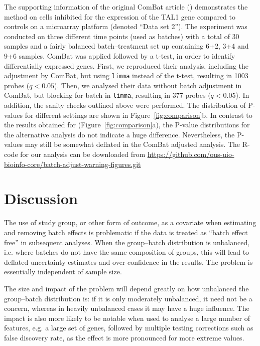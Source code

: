 \documentclass{bio}
\begin{document}
The supporting information of the original ComBat article (\citealp{Johnson2007}) demonstrates the method on cells inhibited for the expression of the TAL1 gene compared to controls on a microarray platform (denoted ``Data set 2''). The experiment was conducted on three different time points (used as batches) with a total of 30 samples and a fairly balanced batch--treatment set up containing 6+2, 3+4 and 9+6 samples. ComBat was applied followed by a t-test, in order to identify differentially expressed genes. First, we reproduced their analysis, including the adjustment by ComBat, but using \texttt{limma} instead of the t-test, resulting in 1003 probes ($q<0.05$).  Then, we analysed their data without batch adjustment in ComBat, but blocking for batch in \texttt{limma}, resulting in 377 probes ($q<0.05$). In addition, the sanity checks outlined above were performed. The distribution of P-values for different settings are shown in Figure~\ref{fig:comparison}b. In contrast to the results obtained for \citet{Towfic2014} (Figure~\ref{fig:comparison}a), the P-value distributions for the alternative analysis do not indicate a huge difference. Nevertheless, the P-values may still be somewhat deflated in the ComBat adjusted analysis. The R-code for our analysis can be downloaded from \href{https://github.com/ous-uio-bioinfo-core/batch-adjust-warning-figures.git}{https://github.com/ous-uio-bioinfo-core/batch-adjust-warning-figures.git}


\section{Discussion}

The use of study group, or other form of outcome, as a covariate when estimating and removing batch effects is problematic if the data is treated as ``batch effect free'' in subsequent analyses. When the group--batch distribution is unbalanced, i.e. where batches do not have the same composition of groups, this will lead to deflated uncertainty estimates and over-confidence in the results. The problem is essentially independent of sample size.

The size and impact of the problem will depend greatly on how unbalanced the group--batch distribution is: if it is only moderately unbalanced, it need not be a concern, whereas in heavily unbalanced cases it may have a huge influence. The impact is also more likely to be notable when used to analyse a large number of features, e.g. a large set of genes, followed by multiple testing corrections such as false discovery rate, as the effect is more pronounced for more extreme values.
\end{document}
